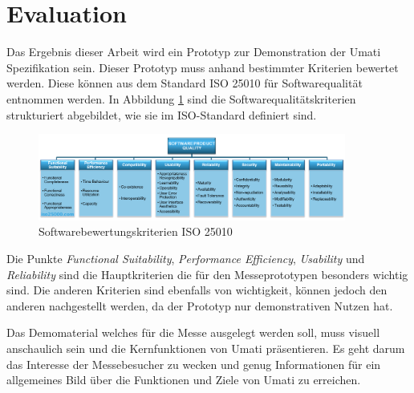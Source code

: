 \documentclass[a4paper, 12pt, oneside]{scrbook}
\begin{document}
	\section{Evaluation}
	
	
	Das Ergebnis dieser Arbeit wird ein Prototyp zur Demonstration der Umati Spezifikation sein. Dieser Prototyp muss anhand bestimmter Kriterien bewertet werden. Diese können aus dem Standard ISO 25010 für Softwarequalität entnommen werden. In Abbildung \ref{fig:ISO25010} sind die Softwarequalitätskriterien strukturiert abgebildet, wie sie im ISO-Standard definiert sind. 
	
	\begin{figure}[H]
		\centering
		\includegraphics[width=0.9\textwidth]{res/diagramms/iso25010.png}
		\caption{Softwarebewertungskriterien ISO 25010} 
		\label{fig:ISO25010}
	\end{figure}
	
	Die Punkte \textit{Functional Suitability}, \textit{Performance Efficiency}, \textit{Usability} und \textit{Reliability} sind die Hauptkriterien die für den Messeprototypen besonders wichtig sind. Die anderen Kriterien sind ebenfalls von wichtigkeit, können jedoch den anderen nachgestellt werden, da der Prototyp nur demonstrativen Nutzen hat. 
	
	
	Das Demomaterial welches für die Messe ausgelegt werden soll, muss visuell anschaulich sein und die Kernfunktionen von Umati präsentieren. Es geht darum das Interesse der Messebesucher zu wecken und genug Informationen für ein allgemeines Bild über die Funktionen und Ziele von Umati zu erreichen. 
	
	
	
	
\end{document}
